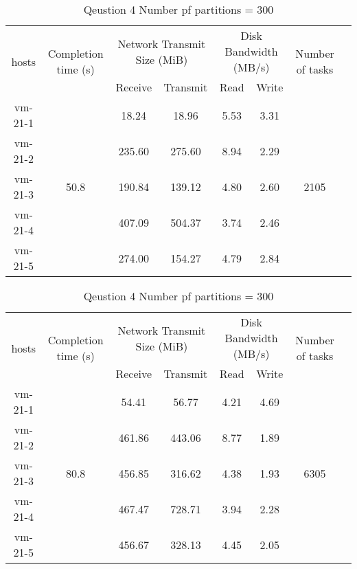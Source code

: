 \begin{enumerate}[label=Question \arabic*.]
\begin{table}[!h]
        \begin{tabular}{|c|c|c|c|c|c|c|c|}
        \hline
            \multirow{2}{*}{hosts} & \multirow{2}{*}{Completion time (s)} & \multicolumn{2}{|c|}{Network Transmit Size (MiB)} & \multicolumn{2}{|c|}{Disk Bandwidth (MB/s)} & \multirow{2}{*}{Number of tasks} \\ 
            \cline{3-6}
        & & Receive & Transmit & Read & Write &  \\
        \hline
            vm-21-1 & \multirow{5}{*}{50.8}  & 18.24  & 18.96  & 5.53 & 3.31 & \multirow{5}{*}{2105}  \\
            vm-21-2 &                        & 235.60 & 275.60 & 8.94 & 2.29 &  \\
            vm-21-3 &                        & 190.84 & 139.12 & 4.80 & 2.60 &  \\
            vm-21-4 &                        & 407.09 & 504.37 & 3.74 & 2.46 &  \\
            vm-21-5 &                        & 274.00 & 154.27 & 4.79 & 2.84 &  \\
        \hline
        \end{tabular}
        \caption{Qeustion 4 Number pf partitions = 100}
        \label{tab:q4:RDD100}
        
        \begin{tabular}{|c|c|c|c|c|c|c|c|}
        \hline
            \multirow{2}{*}{hosts} & \multirow{2}{*}{Completion time (s)} & \multicolumn{2}{|c|}{Network Transmit Size (MiB)} & \multicolumn{2}{|c|}{Disk Bandwidth (MB/s)} & \multirow{2}{*}{Number of tasks} \\ 
            \cline{3-6}
        & & Receive & Transmit & Read & Write &  \\
        \hline
            vm-21-1 & \multirow{5}{*}{80.8}  & 54.41  & 56.77  & 4.21 & 4.69 & \multirow{5}{*}{6305}  \\
            vm-21-2 &                        & 461.86 & 443.06 & 8.77 & 1.89 &  \\
            vm-21-3 &                        & 456.85 & 316.62 & 4.38 & 1.93 &  \\
            vm-21-4 &                        & 467.47 & 728.71 & 3.94 & 2.28 &  \\
            vm-21-5 &                        & 456.67 & 328.13 & 4.45 & 2.05 &  \\
        \hline
        \end{tabular}
        \caption{Qeustion 4 Number pf partitions = 300}
        \label{tab:q4:RDD300}
    \end{table}
    

\end{enumerate}
